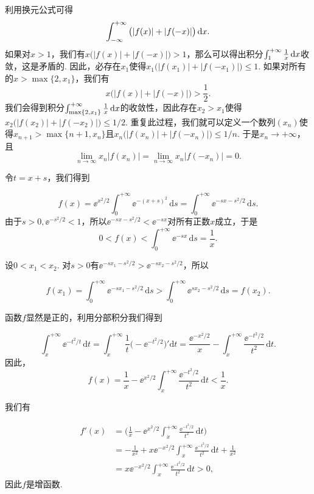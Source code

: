 \begin{ans}
  利用换元公式可得
  \[
    \int_{-\infty}^{+\infty}\big(|f(x)|+|f(-x)| \big)\,\mathrm dx.
  \]
  如果对$x>1$，我们有$x\big(|f(x)|+|f(-x)|\big)>1$，那么可以得出积分$\int_1^{+\infty}\frac1x\,\mathrm dx$收敛，这是矛盾的. 因此，必存在$x_1$使得$x_1\big(|f(x_1)|+|f(-x_1)|\big)\le1$. 如果对所有的$x>\max\{2,x_1\}$，我们有
  \[
    x\big(|f(x)|+|f(-x)|\big) > \frac12.
  \]
  我们会得到积分$\int_{\max\{2,x_1\}}^{+\infty}\frac1x\,\mathrm dx$的收敛性，因此存在$x_2>x_1$使得$x_2\big(|f(x_2)|+|f(-x_2)|\big)\le1/2$. 重复此过程，我们就可以定义一个数列$(x_n)$使得$x_{n+1}>\max\{n+1,x_n\}$且$x_n\big(|f(x_n)|+|f(-x_n)|\big)\le1/n$. 于是$x_n\to+\infty$，且
  \[ \lim_{n\to\infty}x_n|f(x_n)| =\lim_{n\to\infty}
  x_n|f(-x_n)|=0. \]
\end{ans}

\begin{ans}
  \method \begin{enumb}
    \item 令$t=x+s$，我们得到
  \end{enumb}
  \[
    f(x)=\ee^{x^2/2}\int_0^{+\infty}\ee^{-(x+s)^2}\,\mathrm ds = \int_0^{+\infty}\ee^{-sx-s^2/2}\,\mathrm ds.
  \]
  由于$s>0,\ee^{-s^2/2}<1$，所以$\ee^{-sx-s^2/2}<\ee^{-sx}$对所有正数$x$成立，于是
  \[ 0<f(x)<\int_0^{+\infty}\ee^{-sx}\,\mathrm ds=\frac1x. \]
  \begin{enumb}\setcounter{enumi}{1}
    \item 设$0<x_1<x_2$. 对$s>0$有$\ee^{-sx_1-s^2/2}>\ee^{-sx_2-s^2/2}$，所以
  \end{enumb}
  \[
    f(x_1)=\int_0^{+\infty}\ee^{-sx_1-s^2/2}\,\mathrm ds
    >\int_0^{+\infty}\ee^{sx_2-s^2/2}\,\mathrm ds=f(x_2).
  \]
  \method \begin{enumb}
    \item 函数$f$显然是正的，利用分部积分我们得到
  \end{enumb}
      \[
      \int_x^{+\infty}\ee^{-t^2/t}\,\mathrm dt
      =\int_x^{+\infty}\frac1t\big( -\ee^{-t^2/2} \big)'\mathrm dt=\frac{\ee^{-x^2/2}}x
      - \int_x^{+\infty}\frac{\ee^{-t^2/2}}{t^2}\,\mathrm dt.
    \]
    因此，
    \[ f(x) = \frac1x - \ee^{x^2/2}\int_x^{+\infty}
    \frac{\ee^{-t^2/2}}{t^2}\,\mathrm dt<\frac1x. \]
  \begin{enumb}\setcounter{enumi}{1}
    \item 我们有
  \end{enumb}
     \begin{align*}
       f'(x) & = \bigg( \frac1x-\ee^{x^2/2}\int_x^{+\infty}
       \frac{\ee^{-t^2/2}}{t^2}\,\mathrm dt \bigg)\\
       & = -\frac1{x^2}+x\ee^{-x^2/2}\int_x^{+\infty}
       \frac{\ee^{-t^2/2}}{t^2}\,\mathrm dt + \frac1{x^2}\\
       & = x\ee^{-x^2/2}\int_x^{+\infty}\frac{\ee^{-t^2/2}}
       {t^2}\,\mathrm dt>0,
     \end{align*}
  因此$f$是增函数.
\end{ans}

